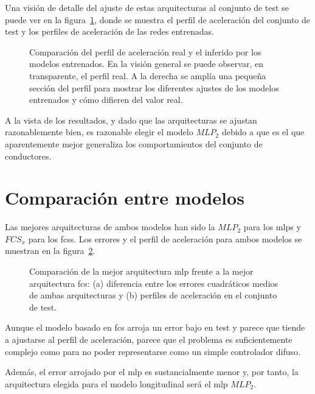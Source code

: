 Una visión de detalle del ajuste de estas arquitecturas al conjunto de test se puede ver en la figura~\ref{fig:mlp-test-comparisons}, donde se muestra el perfil de aceleración del conjunto de test y los perfiles de aceleración de las redes entrenadas.

\begin{figure}
	\centering
	\qquad
	\caption[Comparación del perfil de aceleración real y el inferido por los modelos entrenados]{Comparación del perfil de aceleración real y el inferido por los modelos entrenados. En la visión general se puede observar, en transparente, el perfil real. A la derecha se amplía una pequeña sección del perfil para mostrar los diferentes ajustes de los modelos entrenados y cómo difieren del valor real.}
	\label{fig:mlp-test-comparisons}
\end{figure}

A la vista de los resultados, y dado que las arquitecturas se ajustan razonablemente bien, es razonable elegir el modelo $MLP_2$ debido a que es el que aparentemente mejor generaliza los comportamientos del conjunto de conductores.

\section{Comparación entre modelos}

Las mejores arquitecturas de ambos modelos han sido la $MLP_2$ para los \acp{mlp} y $FCS_x$ para los \acp{fcs}. Los errores y el perfil de aceleración para ambos modelos se muestran en la figura~\ref{fig:comparison-between-best-mlp-and-fcs-architecture}.

\begin{figure}
	\centering
	\qquad
	\caption[Comparación entre los dos tipos de modelo longitudinal]{Comparación de la mejor arquitectura \ac{mlp} frente a la mejor arquitectura \ac{fcs}: (a) diferencia entre los errores cuadráticos medios de ambas arquitecturas y (b) perfiles de aceleración en el conjunto de test.}
	\label{fig:comparison-between-best-mlp-and-fcs-architecture}
\end{figure}

Aunque el modelo basado en \ac{fcs} arroja un error bajo en test y parece que tiende a ajustarse al perfil de aceleración, parece que el problema es suficientemente complejo como para no poder representarse como un simple controlador difuso.

Además, el error arrojado por el \ac{mlp} es sustancialmente menor y, por tanto, la arquitectura elegida para el modelo longitudinal será el \ac{mlp} $MLP_2$.